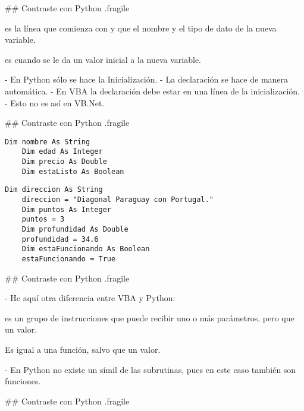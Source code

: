 ## Contraste con Python {.fragile}


\bgnblockdefinition
{} es la línea que comienza con  y que 
el nombre y el tipo de dato de la nueva variable.
\trmblockdefinition

\bgnblockdefinition
{} es cuando se le da un valor inicial a la nueva variable.
\trmblockdefinition

\pause
\vfill


- En Python sólo se hace la Inicialización.
    - La declaración se hace de manera automática.
- En VBA la declaración debe estar en una línea  de la inicialización.
    - Esto no es así en VB.Net.

## Contraste con Python {.fragile}


\begin{lstlisting}[style=vba]
    Dim nombre As String
    Dim edad As Integer
    Dim precio As Double
    Dim estaListo As Boolean
\end{lstlisting}


\begin{lstlisting}[style=vba]
    Dim direccion As String
    direccion = "Diagonal Paraguay con Portugal."
    Dim puntos As Integer
    puntos = 3
    Dim profundidad As Double
    profundidad = 34.6
    Dim estaFuncionando As Boolean
    estaFuncionando = True
\end{lstlisting}

## Contraste con Python {.fragile}


- He aquí otra diferencia entre VBA y Python:

\bgnblockdefinition
{} es un grupo de instrucciones que puede recibir uno o más parámetros,
pero que  un valor.
\trmblockdefinition

\bgnblockdefinition
{} Es igual a una función, salvo que  un valor.
\trmblockdefinition

- En Python no existe un símil de las subrutinas, pues en este caso también son
funciones.

## Contraste con Python {.fragile}

